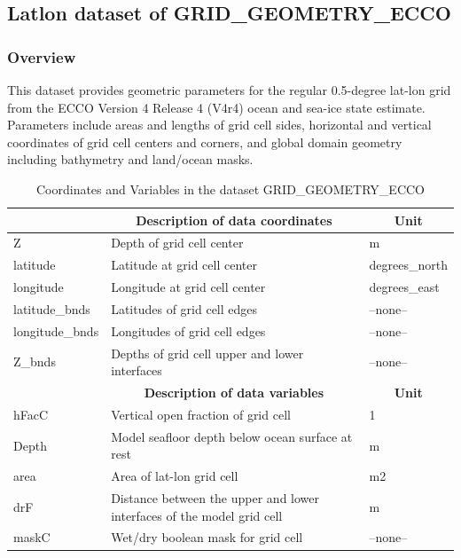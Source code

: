 \subsection{Latlon dataset of GRID\_GEOMETRY\_ECCO}
\newp
\subsubsection{Overview}
This dataset provides geometric parameters for the regular 0.5-degree lat-lon grid from the ECCO Version 4 Release 4 (V4r4) ocean and sea-ice state estimate. Parameters include areas and lengths of grid cell sides, horizontal and vertical coordinates of grid cell centers and corners, and global domain geometry including bathymetry and land/ocean masks. 
\begin{longtable}{|m{}|m{}|m{}|}
\caption{Coordinates and Variables in the dataset GRID\_GEOMETRY\_ECCO}
\label{tab:table-GRID_GEOMETRY_ECCO-fields} \\ 
\hline \endhead \hline \endfoot
\rowcolor{lightgray} \multicolumn{1}{|c|}{\textbf{Coordinates}} & \multicolumn{1}{|c|}{\textbf{Description of data coordinates}} &  \multicolumn{1}{|c|}{\textbf{Unit}}\\ \hline
Z &Depth of grid cell center &m  \\ \hline
latitude &Latitude at grid cell center &degrees\_north  \\ \hline
longitude &Longitude at grid cell center &degrees\_east  \\ \hline
latitude\_bnds &Latitudes of grid cell edges &--none--  \\ \hline
longitude\_bnds &Longitudes of grid cell edges &--none--  \\ \hline
Z\_bnds &Depths of grid cell upper and lower interfaces &--none--  \\ \hline
\rowcolor{lightgray} \multicolumn{1}{|c|}{\textbf{Variables}} & \multicolumn{1}{|c|}{\textbf{Description of data variables}} &  \multicolumn{1}{|c|}{\textbf{Unit}}\\ \hline
hFacC &Vertical open fraction of grid cell &1  \\ \hline
Depth &Model seafloor depth below ocean surface at rest &m  \\ \hline
area &Area of lat-lon grid cell &m2  \\ \hline
drF &Distance between the upper and lower interfaces of the model grid cell &m  \\ \hline
maskC &Wet/dry boolean mask for grid cell &--none--  \\ \hline
\end{longtable}

